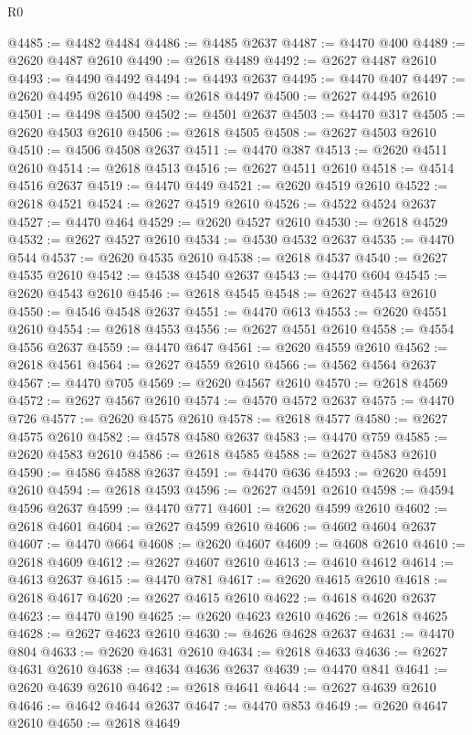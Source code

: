 \begin{lexlean}{R0}
\begin{coremodule}
@4485 := @4482 @4484
@4486 := @4485 @2637
@4487 := @4470 @400
@4489 := @2620 @4487 @2610
@4490 := @2618 @4489
@4492 := @2627 @4487 @2610
@4493 := @4490 @4492
@4494 := @4493 @2637
@4495 := @4470 @407
@4497 := @2620 @4495 @2610
@4498 := @2618 @4497
@4500 := @2627 @4495 @2610
@4501 := @4498 @4500
@4502 := @4501 @2637
@4503 := @4470 @317
@4505 := @2620 @4503 @2610
@4506 := @2618 @4505
@4508 := @2627 @4503 @2610
@4510 := @4506 @4508 @2637
@4511 := @4470 @387
@4513 := @2620 @4511 @2610
@4514 := @2618 @4513
@4516 := @2627 @4511 @2610
@4518 := @4514 @4516 @2637
@4519 := @4470 @449
@4521 := @2620 @4519 @2610
@4522 := @2618 @4521
@4524 := @2627 @4519 @2610
@4526 := @4522 @4524 @2637
@4527 := @4470 @464
@4529 := @2620 @4527 @2610
@4530 := @2618 @4529
@4532 := @2627 @4527 @2610
@4534 := @4530 @4532 @2637
@4535 := @4470 @544
@4537 := @2620 @4535 @2610
@4538 := @2618 @4537
@4540 := @2627 @4535 @2610
@4542 := @4538 @4540 @2637
@4543 := @4470 @604
@4545 := @2620 @4543 @2610
@4546 := @2618 @4545
@4548 := @2627 @4543 @2610
@4550 := @4546 @4548 @2637
@4551 := @4470 @613
@4553 := @2620 @4551 @2610
@4554 := @2618 @4553
@4556 := @2627 @4551 @2610
@4558 := @4554 @4556 @2637
@4559 := @4470 @647
@4561 := @2620 @4559 @2610
@4562 := @2618 @4561
@4564 := @2627 @4559 @2610
@4566 := @4562 @4564 @2637
@4567 := @4470 @705
@4569 := @2620 @4567 @2610
@4570 := @2618 @4569
@4572 := @2627 @4567 @2610
@4574 := @4570 @4572 @2637
@4575 := @4470 @726
@4577 := @2620 @4575 @2610
@4578 := @2618 @4577
@4580 := @2627 @4575 @2610
@4582 := @4578 @4580 @2637
@4583 := @4470 @759
@4585 := @2620 @4583 @2610
@4586 := @2618 @4585
@4588 := @2627 @4583 @2610
@4590 := @4586 @4588 @2637
@4591 := @4470 @636
@4593 := @2620 @4591 @2610
@4594 := @2618 @4593
@4596 := @2627 @4591 @2610
@4598 := @4594 @4596 @2637
@4599 := @4470 @771
@4601 := @2620 @4599 @2610
@4602 := @2618 @4601
@4604 := @2627 @4599 @2610
@4606 := @4602 @4604 @2637
@4607 := @4470 @664
@4608 := @2620 @4607
@4609 := @4608 @2610
@4610 := @2618 @4609
@4612 := @2627 @4607 @2610
@4613 := @4610 @4612
@4614 := @4613 @2637
@4615 := @4470 @781
@4617 := @2620 @4615 @2610
@4618 := @2618 @4617
@4620 := @2627 @4615 @2610
@4622 := @4618 @4620 @2637
@4623 := @4470 @190
@4625 := @2620 @4623 @2610
@4626 := @2618 @4625
@4628 := @2627 @4623 @2610
@4630 := @4626 @4628 @2637
@4631 := @4470 @804
@4633 := @2620 @4631 @2610
@4634 := @2618 @4633
@4636 := @2627 @4631 @2610
@4638 := @4634 @4636 @2637
@4639 := @4470 @841
@4641 := @2620 @4639 @2610
@4642 := @2618 @4641
@4644 := @2627 @4639 @2610
@4646 := @4642 @4644 @2637
@4647 := @4470 @853
@4649 := @2620 @4647 @2610
@4650 := @2618 @4649

\end{coremodule}
\end{lexlean}
